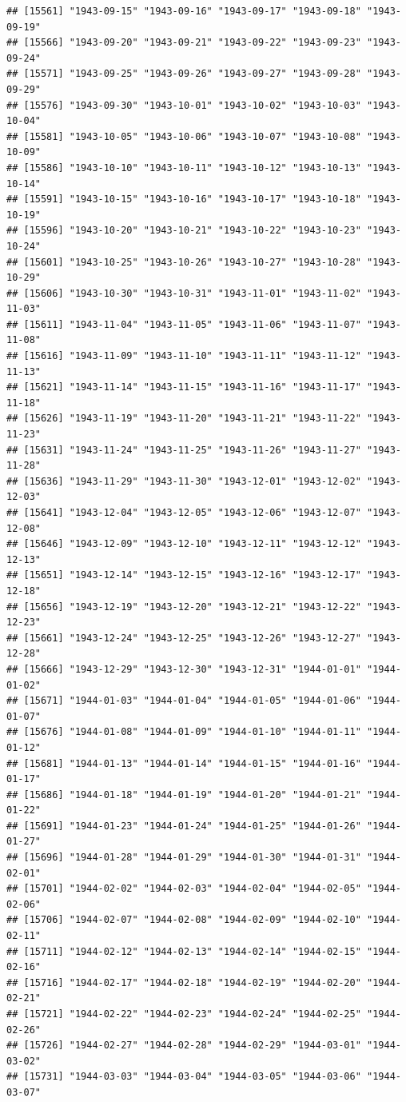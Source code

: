 \documentclass{article}\usepackage[]{graphicx}\usepackage[]{color}
\makeatletter
\newenvironment{kframe}{%
 \def\at@end@of@kframe{}%
 \ifinner\ifhmode%
  \def\at@end@of@kframe{\end{minipage}}%
  \begin{minipage}{\columnwidth}%
 \fi\fi%
 \def\FrameCommand##1{\hskip\@totalleftmargin \hskip-\fboxsep
 \colorbox{shadecolor}{##1}\hskip-\fboxsep
     \hskip-\linewidth \hskip-\@totalleftmargin \hskip\columnwidth}%
 \MakeFramed {\advance\hsize-\width
   \@totalleftmargin\z@ \linewidth\hsize
   \@setminipage}}%
 {\par\unskip\endMakeFramed%
 \at@end@of@kframe}
\newenvironment{knitrout}{}{} %
\makeatother
\begin{document}
\begin{description}
\begin{knitrout}
\begin{kframe}
\begin{verbatim}
## [15561] "1943-09-15" "1943-09-16" "1943-09-17" "1943-09-18" "1943-09-19"
## [15566] "1943-09-20" "1943-09-21" "1943-09-22" "1943-09-23" "1943-09-24"
## [15571] "1943-09-25" "1943-09-26" "1943-09-27" "1943-09-28" "1943-09-29"
## [15576] "1943-09-30" "1943-10-01" "1943-10-02" "1943-10-03" "1943-10-04"
## [15581] "1943-10-05" "1943-10-06" "1943-10-07" "1943-10-08" "1943-10-09"
## [15586] "1943-10-10" "1943-10-11" "1943-10-12" "1943-10-13" "1943-10-14"
## [15591] "1943-10-15" "1943-10-16" "1943-10-17" "1943-10-18" "1943-10-19"
## [15596] "1943-10-20" "1943-10-21" "1943-10-22" "1943-10-23" "1943-10-24"
## [15601] "1943-10-25" "1943-10-26" "1943-10-27" "1943-10-28" "1943-10-29"
## [15606] "1943-10-30" "1943-10-31" "1943-11-01" "1943-11-02" "1943-11-03"
## [15611] "1943-11-04" "1943-11-05" "1943-11-06" "1943-11-07" "1943-11-08"
## [15616] "1943-11-09" "1943-11-10" "1943-11-11" "1943-11-12" "1943-11-13"
## [15621] "1943-11-14" "1943-11-15" "1943-11-16" "1943-11-17" "1943-11-18"
## [15626] "1943-11-19" "1943-11-20" "1943-11-21" "1943-11-22" "1943-11-23"
## [15631] "1943-11-24" "1943-11-25" "1943-11-26" "1943-11-27" "1943-11-28"
## [15636] "1943-11-29" "1943-11-30" "1943-12-01" "1943-12-02" "1943-12-03"
## [15641] "1943-12-04" "1943-12-05" "1943-12-06" "1943-12-07" "1943-12-08"
## [15646] "1943-12-09" "1943-12-10" "1943-12-11" "1943-12-12" "1943-12-13"
## [15651] "1943-12-14" "1943-12-15" "1943-12-16" "1943-12-17" "1943-12-18"
## [15656] "1943-12-19" "1943-12-20" "1943-12-21" "1943-12-22" "1943-12-23"
## [15661] "1943-12-24" "1943-12-25" "1943-12-26" "1943-12-27" "1943-12-28"
## [15666] "1943-12-29" "1943-12-30" "1943-12-31" "1944-01-01" "1944-01-02"
## [15671] "1944-01-03" "1944-01-04" "1944-01-05" "1944-01-06" "1944-01-07"
## [15676] "1944-01-08" "1944-01-09" "1944-01-10" "1944-01-11" "1944-01-12"
## [15681] "1944-01-13" "1944-01-14" "1944-01-15" "1944-01-16" "1944-01-17"
## [15686] "1944-01-18" "1944-01-19" "1944-01-20" "1944-01-21" "1944-01-22"
## [15691] "1944-01-23" "1944-01-24" "1944-01-25" "1944-01-26" "1944-01-27"
## [15696] "1944-01-28" "1944-01-29" "1944-01-30" "1944-01-31" "1944-02-01"
## [15701] "1944-02-02" "1944-02-03" "1944-02-04" "1944-02-05" "1944-02-06"
## [15706] "1944-02-07" "1944-02-08" "1944-02-09" "1944-02-10" "1944-02-11"
## [15711] "1944-02-12" "1944-02-13" "1944-02-14" "1944-02-15" "1944-02-16"
## [15716] "1944-02-17" "1944-02-18" "1944-02-19" "1944-02-20" "1944-02-21"
## [15721] "1944-02-22" "1944-02-23" "1944-02-24" "1944-02-25" "1944-02-26"
## [15726] "1944-02-27" "1944-02-28" "1944-02-29" "1944-03-01" "1944-03-02"
## [15731] "1944-03-03" "1944-03-04" "1944-03-05" "1944-03-06" "1944-03-07"

\end{verbatim}
\end{kframe}
\end{knitrout}
\end{description}
\end{document}
